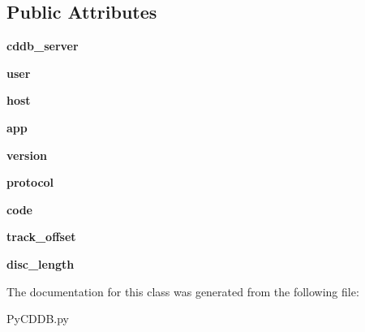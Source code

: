 \subsection*{Public Attributes}
\begin{DoxyCompactItemize}
\item 
\hypertarget{classPyCDDB_1_1PyCDDB_aac4c0fd5bff1b0517091acf71870e879}{
{\bfseries cddb\_\-server}}
\label{classPyCDDB_1_1PyCDDB_aac4c0fd5bff1b0517091acf71870e879}

\item 
\hypertarget{classPyCDDB_1_1PyCDDB_a94eee8c9ad919a97358eab398f0a8b6c}{
{\bfseries user}}
\label{classPyCDDB_1_1PyCDDB_a94eee8c9ad919a97358eab398f0a8b6c}

\item 
\hypertarget{classPyCDDB_1_1PyCDDB_ab10cb4cbacb1ab625b13afee8ee3a2f8}{
{\bfseries host}}
\label{classPyCDDB_1_1PyCDDB_ab10cb4cbacb1ab625b13afee8ee3a2f8}

\item 
\hypertarget{classPyCDDB_1_1PyCDDB_a54964a9cccfda95a0d5f04ac23593390}{
{\bfseries app}}
\label{classPyCDDB_1_1PyCDDB_a54964a9cccfda95a0d5f04ac23593390}

\item 
\hypertarget{classPyCDDB_1_1PyCDDB_a81a560a891a9e0676b5ea1968b1537d7}{
{\bfseries version}}
\label{classPyCDDB_1_1PyCDDB_a81a560a891a9e0676b5ea1968b1537d7}

\item 
\hypertarget{classPyCDDB_1_1PyCDDB_a38cc35174bdd195a03a7630fddeef425}{
{\bfseries protocol}}
\label{classPyCDDB_1_1PyCDDB_a38cc35174bdd195a03a7630fddeef425}

\item 
\hypertarget{classPyCDDB_1_1PyCDDB_aa31b25239d39af0392043561cb9bc45b}{
{\bfseries code}}
\label{classPyCDDB_1_1PyCDDB_aa31b25239d39af0392043561cb9bc45b}

\item 
\hypertarget{classPyCDDB_1_1PyCDDB_a9b1cc8ef17a6e7c3134d3e2bf95ac208}{
{\bfseries track\_\-offset}}
\label{classPyCDDB_1_1PyCDDB_a9b1cc8ef17a6e7c3134d3e2bf95ac208}

\item 
\hypertarget{classPyCDDB_1_1PyCDDB_a45caf901396af1652674ee2d1730c844}{
{\bfseries disc\_\-length}}
\label{classPyCDDB_1_1PyCDDB_a45caf901396af1652674ee2d1730c844}

\end{DoxyCompactItemize}


The documentation for this class was generated from the following file:\begin{DoxyCompactItemize}
\item 
PyCDDB.py\end{DoxyCompactItemize}
